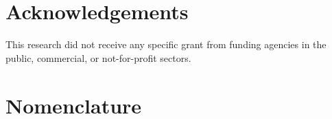 \documentclass[preprint,letterpaper]{elsarticle}
\begin{document}

\section*{Acknowledgements}

This research did not receive any specific grant from funding agencies in the public, commercial, or not-for-profit sectors.


\section*{Nomenclature}
\label{s:nomenclature}
\end{document}
